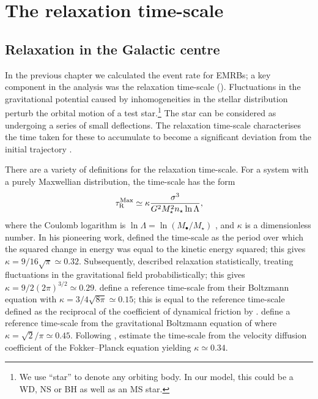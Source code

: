 \chapter{The relaxation time-scale}\label{ch:relax}

\section{Relaxation in the Galactic centre}

In the previous chapter we calculated the event rate for EMRBs; a key component in the analysis was the relaxation time-scale (). Fluctuations in the gravitational potential caused by inhomogeneities in the stellar distribution perturb the orbital motion of a test star.\footnote{We use ``star'' to denote any orbiting body. In our model, this could be a WD, NS or BH as well as an MS star.} The star can be considered as undergoing a series of small deflections. The relaxation time-scale characterises the time taken for these to accumulate to become a significant deviation from the initial trajectory \citep[section 1.2.1]{Binney2008}. 

There are a variety of definitions for the relaxation time-scale. For a system with a purely Maxwellian distribution, the time-scale has the form
\begin{equation}
\tau_\mathrm{R}^\mathrm{Max} \simeq \kappa\dfrac{\sigma^3}{G^2M_\star^2 n_\star\ln\Lambda},
\label{eq:tauMaxwell}
\end{equation}
where the Coulomb logarithm is $\ln\Lambda = \ln(M_\bullet/M_\star)$ \citep{Bahcall1976}, and $\kappa$ is a dimensionless number. In his pioneering work, \citet{Chandrasekhar1941a, Chandrasekhar1960} defined the time-scale as the period over which the squared change in energy was equal to the kinetic energy squared; this gives $\kappa = 9/16\sqrt{\pi} \simeq 0.32$. Subsequently, \citet{Chandrasekhar1941c} described relaxation statistically, treating fluctuations in the gravitational field probabilistically; this gives $\kappa = 9/2(2\pi)^{3/2} \simeq 0.29$. \citet{Bahcall1977} define a reference time-scale from their Boltzmann equation with $\kappa = 3/4\sqrt{8\pi} \simeq 0.15$; this is equal to the reference time-scale defined as the reciprocal of the coefficient of dynamical friction by \citet{Chandrasekhar1943b, Chandrasekhar1943d}. \citet{Spitzer1958Jr} define a reference time-scale from the gravitational Boltzmann equation of \citet{Spitzer1951Jr} where $\kappa = \sqrt{2}/\pi \simeq 0.45$. Following \citet{Spitzer1971Jr}, \citet[section 7.4.5]{Binney2008} estimate the time-scale from the velocity diffusion coefficient of the Fokker--Planck equation yielding $\kappa \simeq 0.34$.

